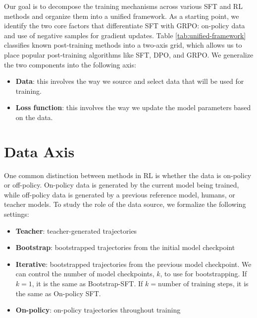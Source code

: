 \documentclass[12pt]{cmuthesis}
\begin{document}
Our goal is to decompose the training mechanisms across various SFT and RL methods and organize them into a unified framework. As a starting point, we identify the two core factors that differentiate SFT with GRPO: on-policy data and use of negative samples for gradient updates. Table \ref{tab:unified-framework} classifies known post-training methods into a two-axis grid, which allows us to place popular post-training algorithms like SFT, DPO, and GRPO.
We generalize the two components into the following axis:
\begin{itemize}
    \item \textbf{Data}: this involves the way we source and select data that will be used for training. 
    \item \textbf{Loss function}: this involves the way we update the model parameters based on the data.
\end{itemize}
   
   
\section{Data Axis}

One common distinction between methods in RL is whether the data is on-policy or off-policy. On-policy data is generated by the current model being trained, while off-policy data is generated by a previous reference model, humans, or teacher models. To study the role of the data source, we formalize the following settings:

\begin{itemize}
    \item \textbf{Teacher}: teacher-generated trajectories
    \item \textbf{Bootstrap}: bootstrapped trajectories from the initial model checkpoint
    \item \textbf{Iterative}: bootstrapped trajectories from the previous model checkpoint. We can control the number of model checkpoints, $k$, to use for bootstrapping. If $k=1$, it is the same as Bootstrap-SFT. If $k=\text{number of training steps}$, it is the same as On-policy SFT.
    \item \textbf{On-policy}: on-policy trajectories throughout training
\end{itemize}
\end{document}
